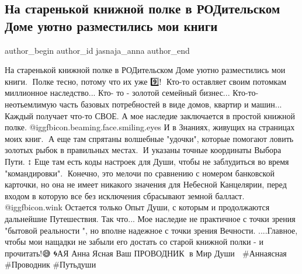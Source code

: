  
 
 
 
 
 
\subsection{На старенькой книжной полке в РОДительском Доме уютно разместились мои книги}
\label{sec:07_09_2021.fb.jasnaja_anna.1.knigi_roditelskij_dom}
 
\ifcmt
 author_begin
   author_id jasnaja_anna
 author_end
\fi

\obeycr
На старенькой книжной полке в РОДительском Доме уютно разместились мои книги.📖 
Полке тесно, потому что их уже 9️⃣!🤗
Кто-то оставляет своим потомкам миллионное наследство...
Кто- то - золотой семейный бизнес...
Кто-то- неотьемлимую часть базовых потребностей в виде домов, квартир и машин...
Каждый получает что-то СВОЕ. 
А мое наследие  заключается в простой книжной полке.  @igg{fbicon.beaming.face.smiling.eyes}   И в Знаниях, живущих на страницах моих книг.📖
А еще там спрятаны волшебные "удочки", которые помогают ловить золотых рыбок в правильных местах.🎣
И указаны точные координаты Выбора Пути. ↕️
Еще там есть коды настроек для Души, чтобы не заблудиться во время "командировки".💎
Конечно, это мелочи по сравнению с номером банковской карточки, но она не имеет никакого значения для Небесной Канцелярии, перед входом в которую все без исключения сбрасывают земной балласт. @igg{fbicon.wink} 
Остается только Опыт Души, с которым и  продолжаются дальнейшие Путешествия.
Так что... Мое наследие не практичное с точки зрения "бытовой реальности ", но вполне надежное с точки зрения Вечности.
....Главное, чтобы мои нащадки не забыли его достать со старой книжной полки - и прочитать!😅
🌀АЯ
Анна Ясная 
Ваш ПРОВОДНИК🔑 в Мир Души 🔑
\#Аннаясная \#Проводник  \#Путьдуши
\restorecr

